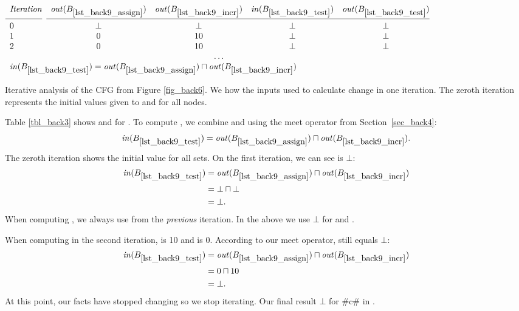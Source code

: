 \documentclass[12pt]{report}
\begin{document}
\begin{table}
  \centering
  \begin{math}
    \begin{array}{lcccc}
      \mathit{Iteration} & \outB{lst_back9_assign} & \outB{lst_back9_incr} & \inB{lst_back9_test} & \outB{lst_back9_test} \\
      \cmidrule(r){1-1}\cmidrule(r){2-5} 
      0 & \bot & \bot & \bot & \bot  \\
      1 & 0 & 10 & \bot & \bot \\
      2 & 0 & 10 & \bot & \bot \\
      \multicolumn{5}{c}{\dots} \\
      \multicolumn{5}{l}{\inB{lst_back9_test} = \outB{lst_back9_assign} \lub \outB{lst_back9_incr}} \\
    \end{array}
  \end{math}
  \caption{Iterative analysis of the CFG from Figure
    \ref{fig_back6}. We how the inputs used to calculate
     change in one iteration. The zeroth
    iteration represents the initial values given to \inBa and \outBa
    for all nodes.}  
  \figend
  \label{tbl_back3}
\end{table}

Table \ref{tbl_back3} shows \inE and \out for
. To compute , we combine
 and  using the meet
operator from Section~\ref{sec_back4}:
\begin{equation}
  \inB{lst_back9_test} = \outB{lst_back9_assign} \lub \outB{lst_back9_incr}.
\end{equation}
The zeroth iteration shows the initial
value for all sets. On the first iteration, we can see  is $\bot$:
\begin{equation}
  \begin{split}
    \inB{lst_back9_test} &= \outB{lst_back9_assign} \lub \outB{lst_back9_incr} \\
    &= \bot \lub \bot \\
    &= \bot.
  \end{split}
\end{equation}
When computing \inBa, we always use \outBa from the
\emph{previous} iteration. In the above we use $\bot$ for  and
. 

When computing  in the second iteration,
 is 10 and  is
0. According to our meet operator,  still equals
$\bot$:
\begin{equation}
  \begin{split}
    \inB{lst_back9_test} &= \outB{lst_back9_assign} \lub \outB{lst_back9_incr} \\
    &= 0 \lub 10 \\
    &= \bot.
  \end{split}
\end{equation}
At this point, our facts have stopped changing so we stop
iterating. Our final result $\bot$ for #c# in .
\end{document}
